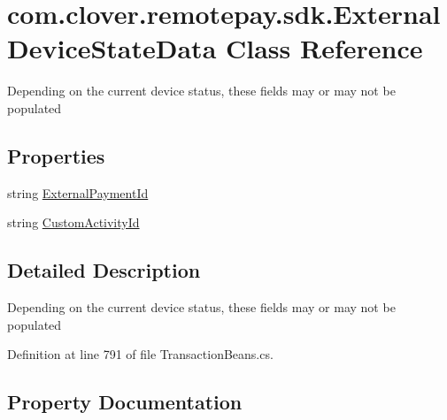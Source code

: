 \hypertarget{classcom_1_1clover_1_1remotepay_1_1sdk_1_1_external_device_state_data}{}\section{com.\+clover.\+remotepay.\+sdk.\+External\+Device\+State\+Data Class Reference}
\label{classcom_1_1clover_1_1remotepay_1_1sdk_1_1_external_device_state_data}


Depending on the current device status, these fields may or may not be populated  


\subsection*{Properties}
\begin{DoxyCompactItemize}
\item 
string \hyperlink{classcom_1_1clover_1_1remotepay_1_1sdk_1_1_external_device_state_data_ae34b82f2e85da36dec8fbe4fae2250be}{External\+Payment\+Id}
\item 
string \hyperlink{classcom_1_1clover_1_1remotepay_1_1sdk_1_1_external_device_state_data_a8f394799ff968d17f4d908aa920019ff}{Custom\+Activity\+Id}
\end{DoxyCompactItemize}


\subsection{Detailed Description}
Depending on the current device status, these fields may or may not be populated 



Definition at line 791 of file Transaction\+Beans.\+cs.



\subsection{Property Documentation}
\mbox{\label{classcom_1_1clover_1_1remotepay_1_1sdk_1_1_external_device_state_data_a8f394799ff968d17f4d908aa920019ff}} 
